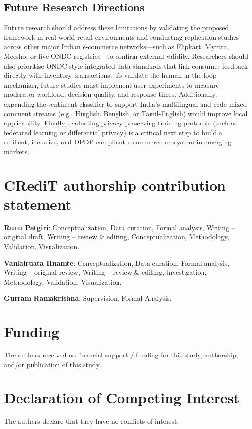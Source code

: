 \documentclass[authoryear,review,3p,times,12pt]{elsarticle}
\begin{document}
\subsection{Future Research Directions}
\label{sec:future_research}
Future research should address these limitations by validating the proposed framework in real-world retail environments and conducting replication studies across other major Indian e-commerce networks—such as Flipkart, Myntra, Meesho, or live ONDC registries—to confirm external validity. Researchers should also prioritise ONDC-style integrated data standards that link consumer feedback directly with inventory transactions. To validate the human-in-the-loop mechanism, future studies must implement user experiments to measure moderator workload, decision quality, and response times. Additionally, expanding the sentiment classifier to support India's multilingual and code-mixed comment streams (e.g., Hinglish, Benglish, or Tamil-English) would improve local applicability. Finally, evaluating privacy-preserving training protocols (such as federated learning or differential privacy) is a critical next step to build a resilient, inclusive, and DPDP-compliant e-commerce ecosystem in emerging markets.


\section*{CRediT authorship contribution statement}
\noindent \textbf{Runu Patgiri}: Conceptualization, Data curation, Formal analysis, Writing – original draft, Writing – review \& editing, Conceptualization, Methodology, Validation, Visualization. 

\noindent \textbf{Vanlalruata Hnamte}: Conceptualization, Data curation, Formal analysis, Writing – original review, Writing – review \& editing, Investigation,  Methodology,  Validation, Visualization.

\noindent \textbf{Gurram Ramakrishna}: Supervision, Formal Analysis.

\section*{Funding} The authors received no financial support / funding for this study, authorship, and/or publication of this study.

\section*{Declaration of Competing Interest}
The authors declare that they have no conflicts of interest.
\end{document}
